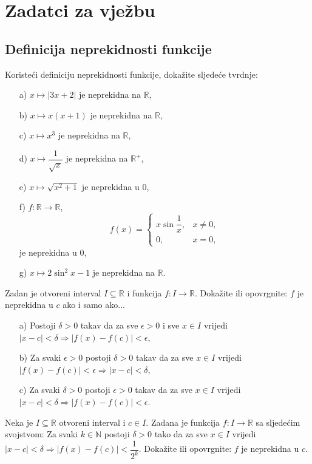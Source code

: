 \section*{Zadatci za vježbu}
\subsection*{Definicija neprekidnosti funkcije}
\begin{exercise}
Koristeći definiciju neprekidnosti funkcije, dokažite sljedeće tvrdnje: 
\begin{itemize}
\item[a)] $x\mapsto |3x+2|$ je neprekidna na $\mathbb{R}$,
\item[b)] $x\mapsto x(x+1)$ je neprekidna na $\mathbb{R}$,
\item[c)] $x\mapsto x^3$ je neprekidna na $\mathbb{R}$,
\item[d)] $x\mapsto \dfrac{1}{\sqrt{x}}$ je neprekidna na $\mathbb{R}^+$,
\item[e)] $x\mapsto \sqrt{x^2+1}$ je neprekidna u $0$,
\item[f)] $f : \mathbb{R}\to \mathbb{R}$, $$f(x)=\begin{cases}
x\sin{\dfrac{1}{x}}, & x\neq 0,\\
0, & x=0,
\end{cases}
$$ 
je neprekidna u $0$,
\item[g)] $x\mapsto 2\sin^2{x}-1$ je neprekidna na $\mathbb{R}$.
\end{itemize}
\end{exercise}
\begin{exercise}
Zadan je otvoreni interval $I\subseteq \mathbb{R}$ i funkcija $f : I\to \mathbb{R}$. Dokažite ili opovrgnite: $f$ je neprekidna u $c$ ako i samo ako...
\begin{itemize}
\item[a)] Postoji $\delta>0$ takav da za sve $\epsilon>0$ i sve $x\in I$ vrijedi $|x-c|<\delta\Rightarrow |f(x)-f(c)|<\epsilon$,
\item[b)] Za svaki $\epsilon>0$ postoji $\delta>0$ takav da za sve $x\in I$ vrijedi $|f(x)-f(c)|<\epsilon\Rightarrow |x-c|<\delta$,
\item[c)] Za svaki $\delta>0$ postoji $\epsilon>0$ takav da za sve $x\in I$ vrijedi $|x-c|<\delta\Rightarrow |f(x)-f(c)|<\epsilon$.
\end{itemize}
\end{exercise}
\begin{exercise}
Neka je $I\subseteq \mathbb{R}$ otvoreni interval i $c\in I$. Zadana je funkcija $f : I\to \mathbb{R}$ sa sljedećim svojstvom: Za svaki $k\in \mathbb{N}$ postoji $\delta>0$ tako da za sve $x\in I$ vrijedi $|x-c|<\delta\Rightarrow |f(x)-f(c)|<\dfrac{1}{2^k}$. Dokažite ili opovrgnite: $f$ je neprekidna u $c$.
\end{exercise}
